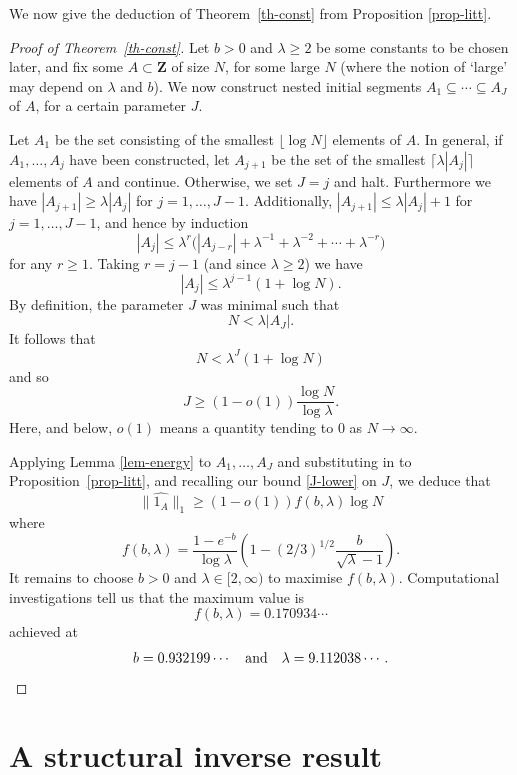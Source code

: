 \documentclass[reqno]{amsart}
\newcommand{\anorm}[1]{\| \widehat{#1}\|}
\renewcommand{\leq}{\leqslant}
\renewcommand{\geq}{\geqslant}
\newcommand{\bbz}{\mathbf{Z}}
\newcommand{\abs}[1]{\left\lvert #1\right\rvert}
\newcommand{\brac}[1]{\left( #1\right)}
\numberwithin{equation}{section}
\theoremstyle{definition}
\theoremstyle{remark}
\begin{document}
We now give the deduction of Theorem~\ref{th-const} from Proposition \ref{prop-litt}.

\begin{proof}[Proof of Theorem~\ref{th-const}] Let $b>0$ and $\lambda \geq 2$ be some constants to be chosen later, and fix some $A\subset \bbz$ of size $N$, for some large $N$ (where the notion of `large' may depend on $\lambda$ and $b$). We now construct nested initial segments $A_1 \subseteq \cdots \subseteq A_J$ of $A$, for a certain parameter $J$. 

Let $A_1$ be the set consisting of the smallest $\lfloor \log N\rfloor$ elements of $A$. In general, if $A_1,\ldots,A_j$ have been constructed, let $A_{j+1}$ be the set of the smallest $\lceil \lambda\abs{A_j}\rceil$ elements of $A$ and continue. Otherwise, we set $J=j$ and halt. Furthermore we have $\abs{A_{j+1}}\geq \lambda\abs{A_{j}}$ for $j = 1,\dots, J-1$. Additionally, $\abs{A_{j+1}}\leq \lambda\abs{A_j}+1$ for $j = 1,\dots, J-1$, and hence by induction
\[ |A_{j}| \leq \lambda^r \big(|A_{j-r}| + \lambda^{-1} + \lambda^{-2} + \cdots + \lambda^{-r}\big) \] for any $r \geq 1$.
Taking $r = j - 1$ (and since $\lambda \geq 2$) we have 
\[ \abs{A_{j}}\leq \lambda^{j-1}(1 + \log N ).\]
By definition, the parameter $J$ was minimal such that
\[N< \lambda\abs{A_J}.\] It follows that 
\[ N < \lambda^{J}(1 + \log N)\]
and so
\begin{equation}\label{J-lower}  J\geq (1-o(1))\frac{\log N}{\log \lambda}.\end{equation}
Here, and below, $o(1)$ means a quantity tending to $0$ as $N \rightarrow \infty$.

Applying Lemma \ref{lem-energy} to $A_1,\dots, A_J$ and substituting in to Proposition~\ref{prop-litt}, and recalling our bound \eqref{J-lower} on $J$, we deduce that
\[\anorm{1_A}_1\geq (1-o(1))f(b,\lambda)\log N\]
where
\[f(b,\lambda)=\frac{1-e^{-b}}{\log \lambda}\brac{1-(2/3)^{1/2}\frac{b}{\sqrt{\lambda} - 1}}.\]
It remains to choose $b>0$ and $\lambda\in [2,\infty)$ to maximise $f(b,\lambda)$. Computational investigations tell us that the maximum value is
\[f(b,\lambda)=0.170934\cdots\]
achieved at
\[b=0.932199\cdots \quad \textrm{and}\quad \lambda=9.112038\cdots.\qedhere\]
\end{proof}

\section{A structural inverse result}
\end{document}
